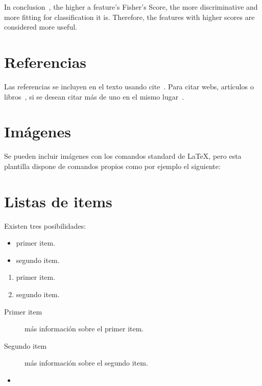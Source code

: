 In conclusion~\cite{feature_selection}, the higher a feature's Fisher's Score, the more discriminative and more fitting for classification it is. Therefore, the features with higher scores are considered more useful.


\section{Referencias}

Las referencias se incluyen en el texto usando cite~\cite{wiki:latex}. Para citar webs, artículos o libros~\cite{koza92}, si se desean citar más de uno en el mismo lugar~\cite{bortolot2005, koza92}.


\section{Imágenes}

Se pueden incluir imágenes con los comandos standard de \LaTeX, pero esta plantilla dispone de comandos propios como por ejemplo el siguiente:




\section{Listas de items}

Existen tres posibilidades:

\begin{itemize}
	\item primer item.
	\item segundo item.
\end{itemize}

\begin{enumerate}
	\item primer item.
	\item segundo item.
\end{enumerate}

\begin{description}
	\item[Primer item] más información sobre el primer item.
	\item[Segundo item] más información sobre el segundo item.
\end{description}
	
\begin{itemize}
\item 
\end{itemize}

